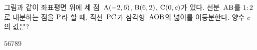 \noindent\begin{minipage}[t]{0.58\linewidth}\vspace{0pt}\raggedright 그림과 같이 좌표평면 위에 세 점~$\mathrm{A}(-2{,}\mkern3mu 6)$, $\mathrm{B}(6{,}\mkern3mu 2)$, $\mathrm{C}(0{,}\mkern3mu c)$가 있다. 선분~$\mathrm{AB}$를 $1:2$로 내분하는 점을 $\mathrm{P}$라 할 때, 직선~$\mathrm{PC}$가 삼각형~$\mathrm{AOB}$의 넓이를 이등분한다. 양수 $c$의 값은? \end{minipage}\hfill\begin{minipage}[t]{0.4\linewidth}\vspace{0pt}\centering \resizebox{\ifdim\width>\linewidth\linewidth\else\width\fi}{!}{}\end{minipage}\par
\begin{choices32}{$5$}{$6$}{$7$}{$8$}{$9$}\end{choices32}

